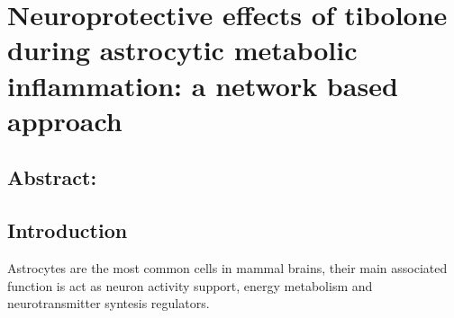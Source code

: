 \chapter{Neuroprotective effects of tibolone during astrocytic metabolic inflammation: a network based approach}
\section*{Abstract:}
\section{Introduction}
Astrocytes are the most common cells in mammal brains, their main associated function is act as neuron activity support, energy metabolism and neurotransmitter syntesis regulators.
